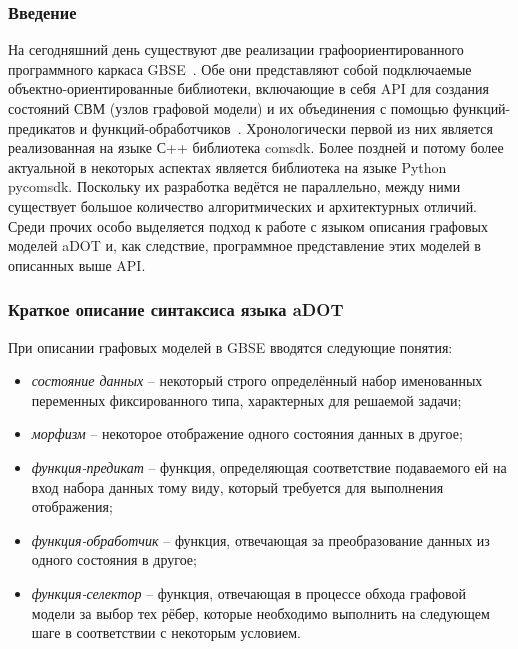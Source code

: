 \def\notedate{2022.02.09}
\def\currentauthor{Тришин И.В. (РК6)}
\subsubsection{Введение}
На сегодняшний день существуют две реализации графоориентированного программного каркаса GBSE~\cite{SokolovPershin2018}. Обе они представляют собой подключаемые объектно-ориентированные библиотеки, включающие в себя API для создания состояний СВМ (узлов графовой модели) и их объединения с помощью функций-предикатов и функций-обработчиков~\cite{SokolovPershin2018}. Хронологически первой из них является реализованная на языке С++ библиотека comsdk. Более поздней и потому более актуальной в некоторых аспектах является библиотека на языке Python pycomsdk. Поскольку их разработка ведётся не параллельно, между ними существует большое количество алгоритмических и архитектурных отличий. Среди прочих особо выделяется подход к работе с языком описания графовых моделей aDOT и, как следствие, программное представление этих моделей в описанных выше API.

\subsubsection{Краткое описание синтаксиса языка aDOT}

При описании графовых моделей в GBSE вводятся следующие понятия:
\begin{itemize}
    \item \textit{состояние данных} -- некоторый строго определённый набор именованных переменных фиксированного типа, характерных для решаемой задачи;
    \item \textit{морфизм} -- некоторое отображение одного состояния данных в другое;
    \item \textit{функция-предикат} -- функция, определяющая соответствие подаваемого ей на вход набора данных тому виду, который требуется для выполнения отображения;
    \item \textit{функция-обработчик} -- функция, отвечающая за преобразование данных из одного состояния в другое;
    \item \textit{функция-селектор} -- функция, отвечающая в процессе обхода графовой модели за выбор тех рёбер, которые необходимо выполнить на следующем шаге в соответствии с некоторым условием.
\end{itemize}

